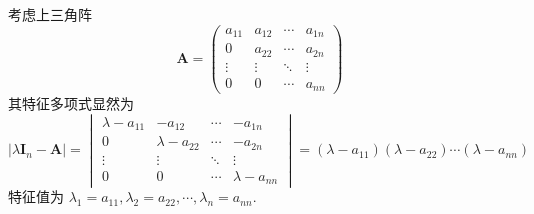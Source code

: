 \begin{brown}
\begin{example}
    考虑上三角阵
    \[
    \bm{A}=\begin{pmatrix}
        a_{11}&a_{12}&\cdots&a_{1n}\\
        0&a_{22}&\cdots&a_{2n}\\
        \vdots&\vdots&\ddots&\vdots\\
        0&0&\cdots&a_{nn}
    \end{pmatrix}
    \]其特征多项式显然为
    \[
    \left|
    \lambda\bm{I}_n-\bm{A}    
    \right|=
    \begin{vmatrix}
        \lambda-a_{11}&-a_{12}&\cdots&-a_{1n}\\
        0&\lambda-a_{22}&\cdots&-a_{2n}\\
        \vdots&\vdots&\ddots&\vdots\\
        0&0&\cdots&\lambda-a_{nn}
    \end{vmatrix}
    =\left(
        \lambda-a_{11}
    \right)\left(
        \lambda-a_{22}
    \right)\cdots\left(
        \lambda-a_{nn}
    \right)
    \]特征值为
    $\lambda_1=a_{11},\lambda_2=a_{22},\cdots,\lambda_n=a_{nn}$.
\end{example}
\end{brown}
